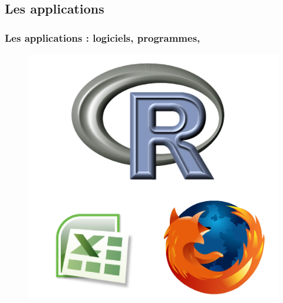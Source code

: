 \documentclass{beamer}
\begin{document}
\subsection{Les applications}
\begin{frame}
	\frametitle{Les applications : logiciels, programmes, }
	\begin{figure}[h]
		\begin{center}
		  \includegraphics[scale=0.45]{image/software.png}
		\end{center}
	\end{figure}
\end{frame}
\end{document}
